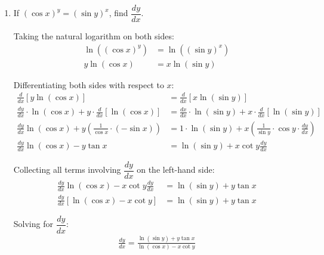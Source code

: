 \begin{enumerate}[label=\thesubsection.\arabic*, ref=\thesubsection.\theenumi]
\begin{align*}
	y(1 + x) &= -x \implies
	y = -\frac{x}{1 + x}
\end{align*}

Rewriting the expression to simplify differentiation:
\begin{align*}
	y = -\frac{(x + 1) - 1}{x + 1} = -\left(1 - \frac{1}{x+1}\right) = -1 + (x+1)^{-1}
\end{align*}

Differentiating both sides with respect to $x$:
\begin{align*}
	\frac{dy}{dx} &= \frac{d}{dx}\left[ -1 + (x+1)^{-1} \right] 
	= -\frac{1}{(x+1)^2}
\end{align*}


\item If $(\cos x)^y=(\sin y)^x$, find $\dfrac{dy}{dx}$.

\solution
Taking the natural logarithm on both sides:
\begin{align*}
	\ln\left((\cos x)^y\right) &= \ln\left((\sin y)^x\right) \\
	y \ln(\cos x) &= x \ln(\sin y)
\end{align*}

Differentiating both sides with respect to $x$:
\begin{align*}
	\frac{d}{dx}\left[y \ln(\cos x)\right] &= \frac{d}{dx}\left[x \ln(\sin y)\right] \\
	\frac{dy}{dx} \cdot \ln(\cos x) + y \cdot \frac{d}{dx}[\ln(\cos x)] &= \frac{dx}{dx} \cdot \ln(\sin y) + x \cdot \frac{d}{dx}[\ln(\sin y)] \\
	\frac{dy}{dx} \ln(\cos x) + y \left(\frac{1}{\cos x} \cdot (-\sin x)\right) &= 1 \cdot \ln(\sin y) + x \left(\frac{1}{\sin y} \cdot \cos y \cdot \frac{dy}{dx}\right) \\
	\frac{dy}{dx} \ln(\cos x) - y \tan x &= \ln(\sin y) + x \cot y \frac{dy}{dx}
\end{align*}

Collecting all terms involving $\dfrac{dy}{dx}$ on the left-hand side:
\begin{align*}
	\frac{dy}{dx} \ln(\cos x) - x \cot y \frac{dy}{dx} &= \ln(\sin y) + y \tan x \\
	\frac{dy}{dx} \left[\ln(\cos x) - x \cot y\right] &= \ln(\sin y) + y \tan x
\end{align*}

Solving for $\dfrac{dy}{dx}$:
\begin{align*}
	\frac{dy}{dx} = \frac{\ln(\sin y) + y \tan x}{\ln(\cos x) - x \cot y}
\end{align*}


\end{enumerate}
